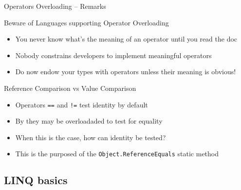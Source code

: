 \documentclass[presentation]{beamer}
\begin{document}
\begin{frame}{Operators Overloading -- Remarks}
  \begin{alertblock}{Beware of Languages supporting Operator Overloading}
    \begin{itemize}
      \item You never know what's the meaning of an operator until you \alert{read the doc}
      \item Nobody constrains developers to implement \alert{meaningful} operators
      \item Do now endow your types with operators unless their meaning is \alert{obvious}!
    \end{itemize}
  \end{alertblock}

  \begin{exampleblock}{Reference Comparison vs Value Comparison}
    \begin{itemize}
      \item Operators \texttt{==} and \texttt{!=} test identity by default
      \item By they may be overloadaded to test for equality
      \item When this is the case, how can identity be tested?
      \item This is the purposed of the \texttt{Object.ReferenceEquals} static method
    \end{itemize}
  \end{exampleblock}
\end{frame}

\subsection{LINQ basics}
\end{document}
